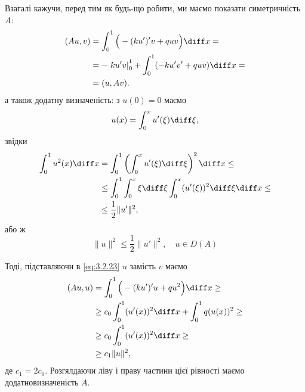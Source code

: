 \begin{remark}
    Взагалі кажучи, перед тим як будь-що робити, ми маємо показати симетричність $A$:
    \begin{equation}
        \label{eq:3.2.23}
        \begin{aligned}
            (A u, v) &= \int_0^1 \Big( -(ku')' v + q u v \Big) \diff x = \\
            &= - \left. k u' v\right|_0^1 + \int_0^1 ( -k u' v' + q u v) \diff x = \\
            &= (u, A v).
        \end{aligned}
    \end{equation}
    а також додатну визначеність: з $u(0) = 0$ маємо
    \begin{equation*}
        u(x) = \int_0^x u'(\xi) \diff \xi,
    \end{equation*}
    звідки
    \begin{equation}
        \label{eq:3.2.24}
        \begin{aligned}
            \int_0^1 u^2(x) \diff x &= \int_0^1 \left( \int_0^x u'(\xi) \diff \xi \right)^2 \diff x \le \\
            &\le \int_0^1 \int_0^x \xi \diff \xi \int_0^x (u'(\xi))^2 \diff \xi \diff x \le \\
            &\le \frac{1}{2} \|u'\|^2,
        \end{aligned}
    \end{equation}
    або ж 
    \begin{equation}
        \label{eq:3.2.25}
        \|u\|^2 \le \frac{1}{2} \|u'\|^2, \quad u \in D(A)
    \end{equation}

    Тоді, підставляючи в \eqref{eq:3.2.23} $u$ замість $v$ маємо
    \begin{equation}
        \label{eq:3.2.27}
        \begin{aligned}
            (A u, u) &= \int_0^1 \Big( -(ku')' u + q u^2 \Big) \diff x \ge \\
            &\ge c_0 \int_0^1 (u'(x))^2 \diff x + \int_0^1 q (u(x))^2 \ge \\
            &\ge c_0 \int_0^1 (u'(x))^2 \diff x \ge \\
            &\ge c_1 \|u\|^2,
        \end{aligned}
    \end{equation}
    де $c_1 = 2 c_0$. Розгялдаючи ліву і праву частини цієї рівності маємо додатновизначеність $A$.
\end{remark}

